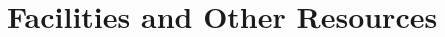 \documentclass[prd,nofootbib,floatfix,11pt,tightenlines,nofootinbib]{revtex4}
\begin{document}
\begin{thebibliography}{99}






















\end{thebibliography} 

\newpage

\section*{Facilities and Other Resources}
\end{document}
